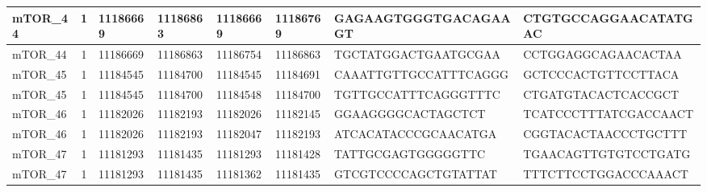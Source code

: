 \begin{landscape}
\begin{longtable}{| p{} | p{} | p{} | p{} | p{} | p{} | p{} | p{} |}
\multicolumn{1}{|l|}{mTOR\_44}   & \multicolumn{1}{c|}{1}  & \multicolumn{1}{l|}{11186669}  & \multicolumn{1}{l|}{11186863}  & \multicolumn{1}{l|}{11186669}  & \multicolumn{1}{l|}{11186769}  & \multicolumn{1}{l|}{GAGAAGTGGGTGACAGAAGT}            & \multicolumn{1}{l|}{CTGTGCCAGGAACATATGAC}          \\ \hline
\multicolumn{1}{|l|}{mTOR\_44}   & \multicolumn{1}{c|}{1}  & \multicolumn{1}{l|}{11186669}  & \multicolumn{1}{l|}{11186863}  & \multicolumn{1}{l|}{11186754}  & \multicolumn{1}{l|}{11186863}  & \multicolumn{1}{l|}{TGCTATGGACTGAATGCGAA}            & \multicolumn{1}{l|}{CCTGGAGGCAGAACACTAA}           \\ \hline
\multicolumn{1}{|l|}{mTOR\_45}   & \multicolumn{1}{c|}{1}  & \multicolumn{1}{l|}{11184545}  & \multicolumn{1}{l|}{11184700}  & \multicolumn{1}{l|}{11184545}  & \multicolumn{1}{l|}{11184691}  & \multicolumn{1}{l|}{CAAATTGTTGCCATTTCAGGG}           & \multicolumn{1}{l|}{GCTCCCACTGTTCCTTACA}           \\ \hline
\multicolumn{1}{|l|}{mTOR\_45}   & \multicolumn{1}{c|}{1}  & \multicolumn{1}{l|}{11184545}  & \multicolumn{1}{l|}{11184700}  & \multicolumn{1}{l|}{11184548}  & \multicolumn{1}{l|}{11184700}  & \multicolumn{1}{l|}{TGTTGCCATTTCAGGGTTTC}            & \multicolumn{1}{l|}{CTGATGTACACTCACCGCT}           \\ \hline
\multicolumn{1}{|l|}{mTOR\_46}   & \multicolumn{1}{c|}{1}  & \multicolumn{1}{l|}{11182026}  & \multicolumn{1}{l|}{11182193}  & \multicolumn{1}{l|}{11182026}  & \multicolumn{1}{l|}{11182145}  & \multicolumn{1}{l|}{GGAAGGGGCACTAGCTCT}              & \multicolumn{1}{l|}{TCATCCCTTTATCGACCAACT}         \\ \hline
\multicolumn{1}{|l|}{mTOR\_46}   & \multicolumn{1}{c|}{1}  & \multicolumn{1}{l|}{11182026}  & \multicolumn{1}{l|}{11182193}  & \multicolumn{1}{l|}{11182047}  & \multicolumn{1}{l|}{11182193}  & \multicolumn{1}{l|}{ATCACATACCCGCAACATGA}            & \multicolumn{1}{l|}{CGGTACACTAACCCTGCTTT}          \\ \hline
\multicolumn{1}{|l|}{mTOR\_47}   & \multicolumn{1}{c|}{1}  & \multicolumn{1}{l|}{11181293}  & \multicolumn{1}{l|}{11181435}  & \multicolumn{1}{l|}{11181293}  & \multicolumn{1}{l|}{11181428}  & \multicolumn{1}{l|}{TATTGCGAGTGGGGGTTC}              & \multicolumn{1}{l|}{TGAACAGTTGTGTCCTGATG}          \\ \hline
\multicolumn{1}{|l|}{mTOR\_47}   & \multicolumn{1}{c|}{1}  & \multicolumn{1}{l|}{11181293}  & \multicolumn{1}{l|}{11181435}  & \multicolumn{1}{l|}{11181362}  & \multicolumn{1}{l|}{11181435}  & \multicolumn{1}{l|}{GTCGTCCCCAGCTGTATTAT}            & \multicolumn{1}{l|}{TTTCTTCCTGGACCCAAACT}          \\ \hline

\end{longtable}
\end{landscape}
